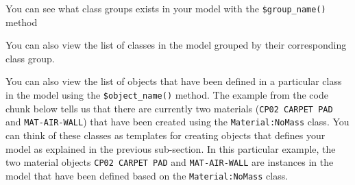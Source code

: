 \documentclass[
]{book}
\newenvironment{Shaded}{\begin{snugshade}}{\end{snugshade}}
\newcommand{\AttributeTok}[1]{\textcolor[rgb]{0.77,0.63,0.00}{#1}}
\newcommand{\ConstantTok}[1]{\textcolor[rgb]{0.00,0.00,0.00}{#1}}
\newcommand{\DocumentationTok}[1]{\textcolor[rgb]{0.56,0.35,0.01}{\textbf{\textit{#1}}}}
\newcommand{\FunctionTok}[1]{\textcolor[rgb]{0.00,0.00,0.00}{#1}}
\newcommand{\NormalTok}[1]{#1}
\newcommand{\SpecialCharTok}[1]{\textcolor[rgb]{0.00,0.00,0.00}{#1}}
\begin{document}
You can see what class groups exists in your model with the \texttt{\$group\_name()} method

\begin{Shaded}
\end{Shaded}

You can also view the list of classes in the model grouped by their corresponding class group.

\begin{Shaded}
\end{Shaded}

You can also view the list of objects that have been defined in a particular class in the model using the \texttt{\$object\_name()} method. The example from the code chunk below tells us that there are currently two materials (\texttt{CP02\ CARPET\ PAD} and \texttt{MAT-AIR-WALL}) that have been created using the \texttt{Material:NoMass} class. You can think of these classes as templates for creating objects that defines your model as explained in the previous sub-section. In this particular example, the two material objects \texttt{CP02\ CARPET\ PAD} and \texttt{MAT-AIR-WALL} are instances in the model that have been defined based on the \texttt{Material:NoMass} class.
\end{document}
